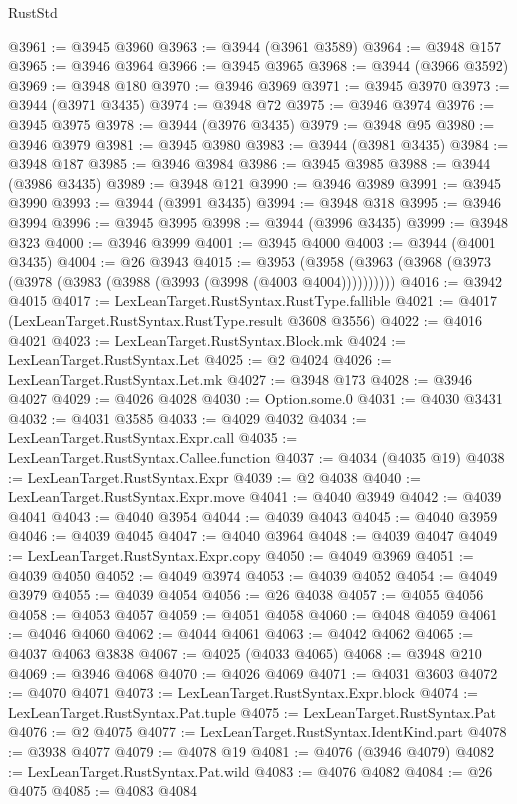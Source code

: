 \begin{lexlean}{RustStd}
\begin{coremodule}
@3961 := @3945 @3960
@3963 := @3944 (@3961 @3589)
@3964 := @3948 @157
@3965 := @3946 @3964
@3966 := @3945 @3965
@3968 := @3944 (@3966 @3592)
@3969 := @3948 @180
@3970 := @3946 @3969
@3971 := @3945 @3970
@3973 := @3944 (@3971 @3435)
@3974 := @3948 @72
@3975 := @3946 @3974
@3976 := @3945 @3975
@3978 := @3944 (@3976 @3435)
@3979 := @3948 @95
@3980 := @3946 @3979
@3981 := @3945 @3980
@3983 := @3944 (@3981 @3435)
@3984 := @3948 @187
@3985 := @3946 @3984
@3986 := @3945 @3985
@3988 := @3944 (@3986 @3435)
@3989 := @3948 @121
@3990 := @3946 @3989
@3991 := @3945 @3990
@3993 := @3944 (@3991 @3435)
@3994 := @3948 @318
@3995 := @3946 @3994
@3996 := @3945 @3995
@3998 := @3944 (@3996 @3435)
@3999 := @3948 @323
@4000 := @3946 @3999
@4001 := @3945 @4000
@4003 := @3944 (@4001 @3435)
@4004 := @26 @3943
@4015 := @3953 (@3958 (@3963 (@3968 (@3973 (@3978 (@3983 (@3988 (@3993 (@3998 (@4003 @4004))))))))))
@4016 := @3942 @4015
@4017 := LexLeanTarget.RustSyntax.RustType.fallible
@4021 := @4017 (LexLeanTarget.RustSyntax.RustType.result @3608 @3556)
@4022 := @4016 @4021
@4023 := LexLeanTarget.RustSyntax.Block.mk
@4024 := LexLeanTarget.RustSyntax.Let
@4025 := @2 @4024
@4026 := LexLeanTarget.RustSyntax.Let.mk
@4027 := @3948 @173
@4028 := @3946 @4027
@4029 := @4026 @4028
@4030 := Option.some.{0}
@4031 := @4030 @3431
@4032 := @4031 @3585
@4033 := @4029 @4032
@4034 := LexLeanTarget.RustSyntax.Expr.call
@4035 := LexLeanTarget.RustSyntax.Callee.function
@4037 := @4034 (@4035 @19)
@4038 := LexLeanTarget.RustSyntax.Expr
@4039 := @2 @4038
@4040 := LexLeanTarget.RustSyntax.Expr.move
@4041 := @4040 @3949
@4042 := @4039 @4041
@4043 := @4040 @3954
@4044 := @4039 @4043
@4045 := @4040 @3959
@4046 := @4039 @4045
@4047 := @4040 @3964
@4048 := @4039 @4047
@4049 := LexLeanTarget.RustSyntax.Expr.copy
@4050 := @4049 @3969
@4051 := @4039 @4050
@4052 := @4049 @3974
@4053 := @4039 @4052
@4054 := @4049 @3979
@4055 := @4039 @4054
@4056 := @26 @4038
@4057 := @4055 @4056
@4058 := @4053 @4057
@4059 := @4051 @4058
@4060 := @4048 @4059
@4061 := @4046 @4060
@4062 := @4044 @4061
@4063 := @4042 @4062
@4065 := @4037 @4063 @3838
@4067 := @4025 (@4033 @4065)
@4068 := @3948 @210
@4069 := @3946 @4068
@4070 := @4026 @4069
@4071 := @4031 @3603
@4072 := @4070 @4071
@4073 := LexLeanTarget.RustSyntax.Expr.block
@4074 := LexLeanTarget.RustSyntax.Pat.tuple
@4075 := LexLeanTarget.RustSyntax.Pat
@4076 := @2 @4075
@4077 := LexLeanTarget.RustSyntax.IdentKind.part
@4078 := @3938 @4077
@4079 := @4078 @19
@4081 := @4076 (@3946 @4079)
@4082 := LexLeanTarget.RustSyntax.Pat.wild
@4083 := @4076 @4082
@4084 := @26 @4075
@4085 := @4083 @4084

\end{coremodule}
\end{lexlean}
